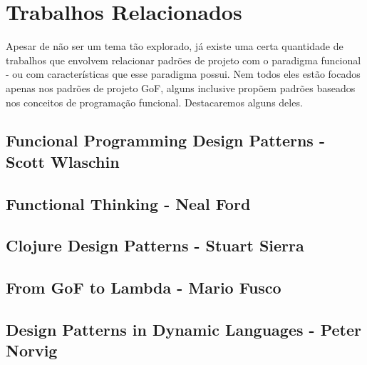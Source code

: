 \chapter{Trabalhos Relacionados}

Apesar de não ser um tema tão explorado, já existe uma 
certa quantidade de trabalhos que envolvem relacionar 
padrões de projeto com o paradigma funcional - ou com 
características que esse paradigma possui. Nem todos eles 
estão focados apenas nos padrões de projeto GoF, alguns 
inclusive propõem padrões baseados nos conceitos de 
programação funcional. Destacaremos alguns deles.

\section{Funcional Programming Design Patterns - Scott Wlaschin}


\section{Functional Thinking - Neal Ford}


\section{Clojure Design Patterns - Stuart Sierra}


\section{From GoF to Lambda - Mario Fusco}


\section{Design Patterns in Dynamic Languages - Peter Norvig}

